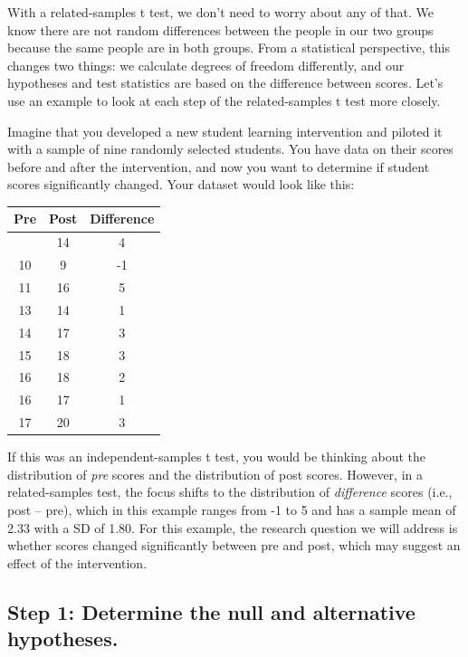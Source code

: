 \documentclass[
  letterpaper,
  DIV=11,
  numbers=noendperiod]{scrreprt}
\begin{document}
With a related-samples t test, we don't need to worry about any of that.
We know there are not random differences between the people in our two
groups because the same people are in both groups. From a statistical
perspective, this changes two things: we calculate degrees of freedom
differently, and our hypotheses and test statistics are based on the
difference between scores. Let's use an example to look at each step of
the related-samples t test more closely.

Imagine that you developed a new student learning intervention and
piloted it with a sample of nine randomly selected students. You have
data on their scores before and after the intervention, and now you want
to determine if student scores significantly changed. Your dataset would
look like this:

\begin{longtable}[]{@{}ccc@{}}
\toprule\noalign{}
Pre & Post & Difference \\
\midrule\noalign{}
\endhead
\bottomrule\noalign{}
\endlastfoot
10 & 14 & 4 \\
10 & 9 & -1 \\
11 & 16 & 5 \\
13 & 14 & 1 \\
14 & 17 & 3 \\
15 & 18 & 3 \\
16 & 18 & 2 \\
16 & 17 & 1 \\
17 & 20 & 3 \\
\end{longtable}

If this was an independent-samples t test, you would be thinking about
the distribution of \emph{pre} scores and the distribution of post
scores. However, in a related-samples test, the focus shifts to the
distribution of \emph{difference} scores (i.e., post -- pre), which in
this example ranges from -1 to 5 and has a sample mean of 2.33 with a SD
of 1.80. For this example, the research question we will address is
whether scores changed significantly between pre and post, which may
suggest an effect of the intervention.

\subsection*{Step 1: Determine the null and alternative
hypotheses.}\label{step-1-determine-the-null-and-alternative-hypotheses.-2}
\end{document}
